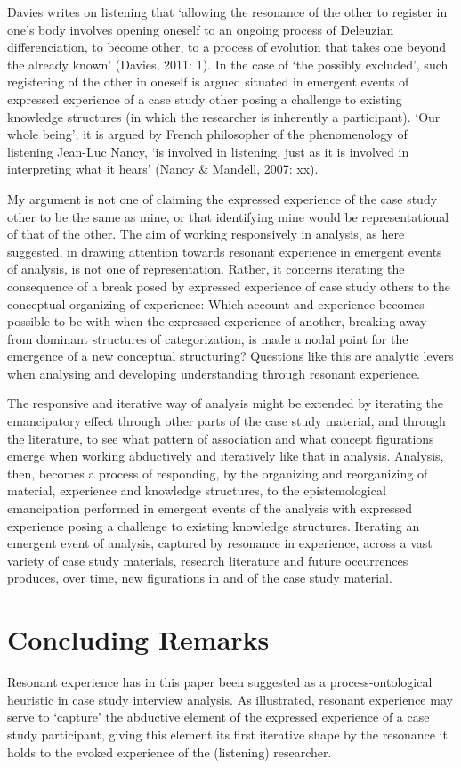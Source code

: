 Davies writes on listening that ‘allowing the resonance of the other to register in one’s body involves opening oneself to an ongoing process of Deleuzian differenciation, to become other, to a process of evolution that takes one beyond the already known’ (Davies, 2011: 1). In the case of ‘the possibly excluded’, such registering of the other in oneself is argued situated in emergent events of expressed experience of a case study other posing a challenge to existing knowledge structures (in which the researcher is inherently a participant). ‘Our whole being’, it is argued by French philosopher of the phenomenology of listening Jean-Luc Nancy, ‘is involved in listening, just as it is involved in interpreting what it hears’ (Nancy \& Mandell, 2007: xx). 

My argument is not one of claiming the expressed experience of the case study other to be the same as mine, or that identifying mine would be representational of that of the other. The aim of working responsively in analysis, as here suggested, in drawing attention towards resonant experience in emergent events of analysis, is not one of representation. Rather, it concerns iterating the consequence of a break posed by expressed experience of case study others to the conceptual organizing of experience: Which account and experience becomes possible to be with when the expressed experience of another, breaking away from dominant structures of categorization, is made a nodal point for the emergence of a new conceptual structuring? Questions like this are analytic levers when analysing and developing understanding through resonant experience.

The responsive and iterative way of analysis might be extended by iterating the emancipatory effect through other parts of the case study material, and through the literature, to see what pattern of association and what concept figurations emerge when working abductively and iteratively like that in analysis. Analysis, then, becomes a process of responding, by the organizing and reorganizing of material, experience and knowledge structures, to the epistemological emancipation performed in emergent events of the analysis with expressed experience posing a challenge to existing knowledge structures. Iterating an emergent event of analysis, captured by resonance in experience, across a vast variety of case study materials, research literature and future occurrences produces, over time, new figurations in and of the case study material. 

\chapter{Concluding Remarks}
Resonant experience has in this paper been suggested as a process-ontological heuristic in case study interview analysis. As illustrated, resonant experience may serve to ‘capture’ the abductive element of the expressed experience of a case study participant, giving this element its first iterative shape by the resonance it holds to the evoked experience of the (listening) researcher.

